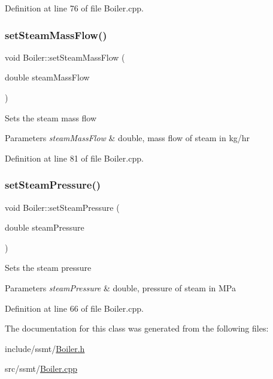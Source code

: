 Definition at line 76 of file Boiler.\+cpp.

\mbox{\label{class_boiler_ada7af5896a2a4701d78a532dc9bc9892}} 
\subsubsection{\texorpdfstring{set\+Steam\+Mass\+Flow()}{setSteamMassFlow()}}
{\footnotesize\ttfamily void Boiler\+::set\+Steam\+Mass\+Flow (\begin{DoxyParamCaption}\item[{double}]{steam\+Mass\+Flow }\end{DoxyParamCaption})}

Sets the steam mass flow 
\begin{DoxyParams}{Parameters}
{\em steam\+Mass\+Flow} & double, mass flow of steam in kg/hr \\
\hline
\end{DoxyParams}


Definition at line 81 of file Boiler.\+cpp.

\mbox{\label{class_boiler_a0a4619ff73c9969daebe3aa66ddad6be}} 
\subsubsection{\texorpdfstring{set\+Steam\+Pressure()}{setSteamPressure()}}
{\footnotesize\ttfamily void Boiler\+::set\+Steam\+Pressure (\begin{DoxyParamCaption}\item[{double}]{steam\+Pressure }\end{DoxyParamCaption})}

Sets the steam pressure 
\begin{DoxyParams}{Parameters}
{\em steam\+Pressure} & double, pressure of steam in M\+Pa \\
\hline
\end{DoxyParams}


Definition at line 66 of file Boiler.\+cpp.



The documentation for this class was generated from the following files\+:\begin{DoxyCompactItemize}
\item 
include/ssmt/\hyperlink{_boiler_8h}{Boiler.\+h}\item 
src/ssmt/\hyperlink{_boiler_8cpp}{Boiler.\+cpp}\end{DoxyCompactItemize}
